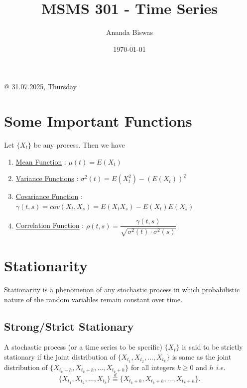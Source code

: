 \documentclass[11pt, a4paper]{article}
\title{MSMS 301 - Time Series}
\author{Ananda Biswas}
\date{\today}
\begin{document}
\maketitle

\tableofcontents

\newpage

\begin{flushright}
\textcolor{col2}{@ 31.07.2025, Thursday}
\end{flushright}

\section{Some Important Functions}

Let $\{X_t\}$ be any process. Then we have

\begin{enumerate}[(1)]

\item \underline{Mean Function} : $\mu(t) = E(X_t)$

\item \underline{Variance Functions} : $\sigma^2(t) = E(X_t^2) - (E(X_t))^2$

\item \underline{Covariance Function} : $\gamma(t, s) = cov(X_t, X_s) = E(X_t X_s) - E(X_t)E(X_s)$

\item \underline{Correlation Function} : $\rho(t, s) = \dfrac{\gamma(t, s)}{\sqrt{\sigma^2(t) \cdot \sigma^2(s)}}$
\end{enumerate}

\section{Stationarity}

Stationarity is a phenomenon of any stochastic process in which probabilistic nature of the random variables remain constant over time.

\subsection{Strong/Strict Stationary}

A stochastic process (or a time series to be specific) $\{X_t\}$ is said to be strictly stationary if the joint distribution of $\{X_{t_1}, X_{t_2}, \ldots, X_{t_k}\}$ is same as the joint distribution of $\{X_{t_k + h}, X_{t_k + h}, \ldots, X_{t_k + h}\}$ for all integers $k \geq 0$ and $h$ \textit{i.e.} $$\{X_{t_1}, X_{t_2}, \ldots, X_{t_k}\} \overset{d}{\equiv} \{X_{t_k + h}, X_{t_k + h}, \ldots, X_{t_k + h}\}.$$
\end{document}
